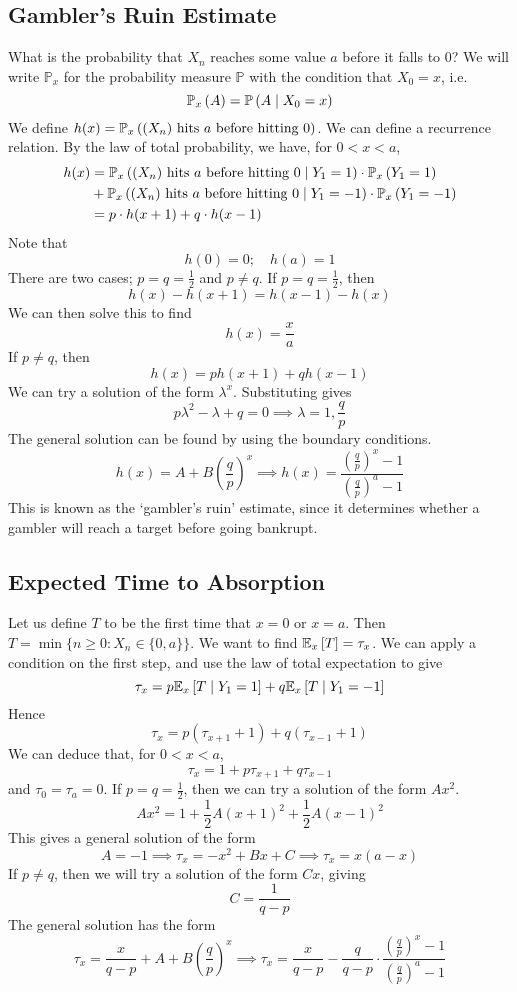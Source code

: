 \documentclass{article}
\begin{document}
\subsection{Gambler's Ruin Estimate}
What is the probability that $X_n$ reaches some value $a$ before it falls to 0? We will write $\mathbb P_x$ for the probability measure $\mathbb P$ with the condition that $X_0 = x$, i.e.
\[ \mathbb{P}_{x}\left({A}\right) = \mathbb{P}\left({A \mid X_0 = x}\right) \]
We define $h(x) = \mathbb{P}_{x}\left({(X_n) \text{ hits $a$ before hitting 0}}\right)$. We can define a recurrence relation. By the law of total probability, we have, for $0 < x < a$,
\begin{align*}
    h(x) & = \mathbb{P}_{x}\left({(X_n) \text{ hits $a$ before hitting 0} \mid Y_1 = 1}\right) \cdot \mathbb{P}_{x}\left({Y_1 = 1}\right)   \\
         & + \mathbb{P}_{x}\left({(X_n) \text{ hits $a$ before hitting 0} \mid Y_1 = -1}\right) \cdot \mathbb{P}_{x}\left({Y_1 = -1}\right) \\
         & = p \cdot h(x+1) + q \cdot h(x-1)
\end{align*}
Note that
\[ h(0) = 0;\quad h(a) = 1 \]
There are two cases; $p=q = \frac{1}{2}$ and $p \neq q$. If $p=q=\frac{1}{2}$, then
\[ h(x) - h(x+1) = h(x-1) - h(x) \]
We can then solve this to find
\[ h(x) = \frac{x}{a} \]
If $p \neq q$, then
\[ h(x) = ph(x+1) + qh(x-1) \]
We can try a solution of the form $\lambda^x$. Substituting gives
\[ p\lambda^2 - \lambda + q = 0 \implies \lambda = 1, \frac{q}{p} \]
The general solution can be found by using the boundary conditions.
\[ h(x) = A + B \left( \frac{q}{p} \right)^x \implies h(x) = \frac{\left( \frac{q}{p} \right)^x - 1}{\left( \frac{q}{p} \right)^a - 1} \]
This is known as the `gambler's ruin' estimate, since it determines whether a gambler will reach a target before going bankrupt.

\subsection{Expected Time to Absorption}
Let us define $T$ to be the first time that $x = 0$ or $x = a$. Then $T = \min \{ n \geq 0 \colon X_n \in \{ 0, a \} \}$. We want to find $\mathbb{E}_{x}\left[{T}\right] = \tau_x$. We can apply a condition on the first step, and use the law of total expectation to give
\[ \tau_x = p \mathbb{E}_{x}\left[{T \mid Y_1 = 1}\right] + q \mathbb{E}_{x}\left[{T \mid Y_1 = -1}\right] \]
Hence
\[ \tau_x = p (\tau_{x + 1} + 1) + q (\tau_{x - 1} + 1) \]
We can deduce that, for $0 < x < a$,
\[ \tau_x = 1 + p \tau_{x+1} + q \tau_{x-1} \]
and $\tau_0 = \tau_a = 0$. If $p = q = \frac{1}{2}$, then we can try a solution of the form $Ax^2$.
\[ Ax^2 = 1 + \frac{1}{2}A(x+1)^2 + \frac{1}{2}A(x-1)^2 \]
This gives a general solution of the form
\[ A = -1 \implies \tau_x = -x^2 + Bx + C \implies \tau_x = x(a-x) \]
If $p \neq q$, then we will try a solution of the form $Cx$, giving
\[ C = \frac{1}{q-p} \]
The general solution has the form
\[ \tau_x = \frac{x}{q-p} + A + B\left( \frac{q}{p} \right)^x \implies \tau_x = \frac{x}{q-p} - \frac{q}{q-p} \cdot \frac{\left( \frac{q}{p} \right)^x - 1}{\left( \frac{q}{p} \right)^a - 1}  \]
\end{document}
